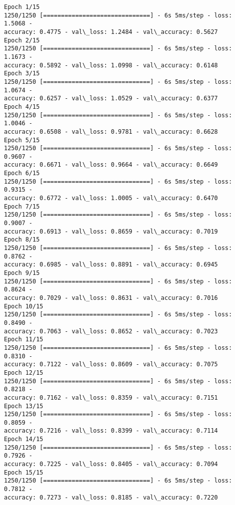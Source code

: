 \documentclass[11pt]{article}
\begin{document}
    \begin{Verbatim}[commandchars=\\\{\}]
Epoch 1/15
1250/1250 [==============================] - 6s 5ms/step - loss: 1.5068 -
accuracy: 0.4775 - val\_loss: 1.2484 - val\_accuracy: 0.5627
Epoch 2/15
1250/1250 [==============================] - 6s 5ms/step - loss: 1.1673 -
accuracy: 0.5892 - val\_loss: 1.0998 - val\_accuracy: 0.6148
Epoch 3/15
1250/1250 [==============================] - 6s 5ms/step - loss: 1.0674 -
accuracy: 0.6257 - val\_loss: 1.0529 - val\_accuracy: 0.6377
Epoch 4/15
1250/1250 [==============================] - 6s 5ms/step - loss: 1.0046 -
accuracy: 0.6508 - val\_loss: 0.9781 - val\_accuracy: 0.6628
Epoch 5/15
1250/1250 [==============================] - 6s 5ms/step - loss: 0.9607 -
accuracy: 0.6671 - val\_loss: 0.9664 - val\_accuracy: 0.6649
Epoch 6/15
1250/1250 [==============================] - 6s 5ms/step - loss: 0.9315 -
accuracy: 0.6772 - val\_loss: 1.0005 - val\_accuracy: 0.6470
Epoch 7/15
1250/1250 [==============================] - 6s 5ms/step - loss: 0.9007 -
accuracy: 0.6913 - val\_loss: 0.8659 - val\_accuracy: 0.7019
Epoch 8/15
1250/1250 [==============================] - 6s 5ms/step - loss: 0.8762 -
accuracy: 0.6985 - val\_loss: 0.8891 - val\_accuracy: 0.6945
Epoch 9/15
1250/1250 [==============================] - 6s 5ms/step - loss: 0.8624 -
accuracy: 0.7029 - val\_loss: 0.8631 - val\_accuracy: 0.7016
Epoch 10/15
1250/1250 [==============================] - 6s 5ms/step - loss: 0.8490 -
accuracy: 0.7063 - val\_loss: 0.8652 - val\_accuracy: 0.7023
Epoch 11/15
1250/1250 [==============================] - 6s 5ms/step - loss: 0.8310 -
accuracy: 0.7122 - val\_loss: 0.8609 - val\_accuracy: 0.7075
Epoch 12/15
1250/1250 [==============================] - 6s 5ms/step - loss: 0.8218 -
accuracy: 0.7162 - val\_loss: 0.8359 - val\_accuracy: 0.7151
Epoch 13/15
1250/1250 [==============================] - 6s 5ms/step - loss: 0.8059 -
accuracy: 0.7216 - val\_loss: 0.8399 - val\_accuracy: 0.7114
Epoch 14/15
1250/1250 [==============================] - 6s 5ms/step - loss: 0.7926 -
accuracy: 0.7225 - val\_loss: 0.8405 - val\_accuracy: 0.7094
Epoch 15/15
1250/1250 [==============================] - 6s 5ms/step - loss: 0.7812 -
accuracy: 0.7273 - val\_loss: 0.8185 - val\_accuracy: 0.7220
    \end{Verbatim}
\end{document}
